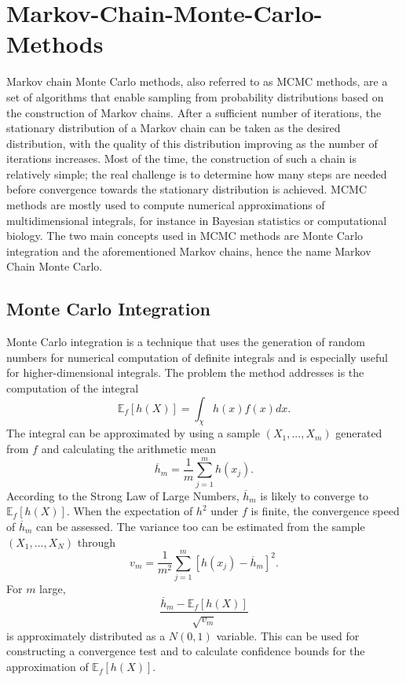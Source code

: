 \documentclass[12pt]{book}
\begin{document}
\section{Markov-Chain-Monte-Carlo-Methods}
Markov chain Monte Carlo methods, also referred to as MCMC methods, are a set of algorithms that enable sampling from probability distributions based on the construction of Markov chains. After a sufficient number of iterations, the stationary distribution of a Markov chain can be taken as the desired distribution, with the quality of this distribution improving as the number of iterations increases. Most of the time, the construction of such a chain is relatively simple; the real challenge is to determine how many steps are needed before convergence towards the stationary distribution is achieved. MCMC methods are mostly used to compute numerical approximations of multidimensional integrals, for instance in Bayesian statistics or computational biology. The two main concepts used in MCMC methods are Monte Carlo integration and the aforementioned Markov chains, hence the name Markov Chain Monte Carlo.
\subsection{Monte Carlo Integration}
Monte Carlo integration is a technique that uses the generation of random numbers for numerical computation of definite integrals and is especially useful for higher-dimensional integrals. The problem the method addresses is the computation of the integral
\begin{equation}
    \mathbb{E}_f\left[h\left(X\right)\right]=\int_\chi h(x)f(x)dx.
\end{equation}
The integral can be approximated by using a sample $\left(X_1,...,X_m\right)$ generated from $f$ and calculating the arithmetic mean
\begin{equation}
    \overline{h}_m=\frac{1}{m}\sum_{j=1}^mh\left(x_j\right).
\end{equation}
According to the Strong Law of Large Numbers, $\overline{h}_m$ is likely to converge to $\mathbb{E}_f\left[h\left(X\right)\right]$. When the expectation of $h^2$ under $f$ is finite, the convergence speed of $\overline{h}_m$ can be assessed. The variance too can be estimated from the sample $\left(X_1,...,X_N\right)$ through
\begin{equation}
    v_m=\frac{1}{m^2}\sum_{j=1}^m\left[h\left(x_j\right)-\overline{h}_m\right]^2.
\end{equation}
For $m$ large,
\begin{equation}
    \frac{\overline{h}_m-\mathbb{E}_f\left[h\left(X\right)\right]}{\sqrt{v_m}}
\end{equation}
is approximately distributed as a $N(0,1)$ variable. This can be used for constructing a convergence test and to calculate confidence bounds for the approximation of $\mathbb{E}_f\left[h\left(X\right)\right]$.\autocite[Cf.][]{robert2013monte}
\end{document}
